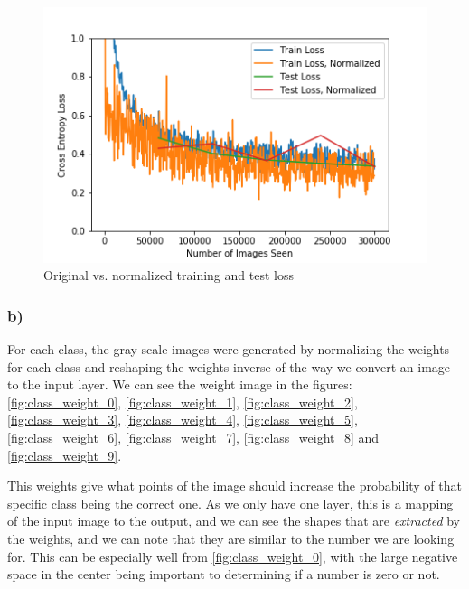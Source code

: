 \begin{figure}[]
    \centering
    \includegraphics[width=1.00\textwidth]{figures/training/original_vs_normalized_training_loss.png}
    \caption{Original vs. normalized training and test loss}
    \label{fig:normalized_training_loss}
\end{figure}

\subsubsection*{b)}
For each class, the gray-scale images were generated by normalizing the weights for each class and reshaping the weights inverse of the way we convert an image to the input layer. We can see the weight image in the figures: \cref{fig:class_weight_0}, \cref{fig:class_weight_1}, \cref{fig:class_weight_2}, \cref{fig:class_weight_3}, \cref{fig:class_weight_4}, \cref{fig:class_weight_5}, \cref{fig:class_weight_6}, \cref{fig:class_weight_7}, \cref{fig:class_weight_8} and \cref{fig:class_weight_9}.  

This weights give what points of the image should increase the probability of that specific class being the correct one. As we only have one layer, this is a mapping of the input image to the output, and we can see the shapes that are \textit{extracted} by the weights, and we can note that they are similar to the number we are looking for. This can be especially well from \cref{fig:class_weight_0}, with the large negative space in the center being important to determining if a number is zero or not. 

